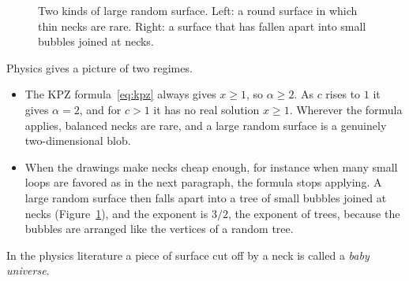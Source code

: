 \begin{figure}[b]
\centering
{}
\caption{Two kinds of large random surface. Left: a round surface in which thin necks are rare.
Right: a surface that has fallen apart into small bubbles joined at necks.}
\label{fig:bubbles}
\end{figure}

Physics gives a picture of two regimes.
\begin{itemize}
\item The KPZ formula~\eqref{eq:kpz} always gives $x\ge1$, so $\alpha\ge2$. As $c$ rises to $1$
it gives $\alpha=2$, and for $c>1$ it has no real solution $x\ge1$. Wherever the formula applies,
balanced necks are rare, and a large random surface is a genuinely two-dimensional blob.
\item When the drawings make necks cheap enough, for instance when many small loops are favored
as in the next paragraph, the formula stops applying. A large random
surface then falls apart into a tree of small bubbles joined at necks
(Figure~\ref{fig:bubbles}), and the exponent is $3/2$, the exponent of trees, because the
bubbles are arranged like the vertices of a random tree.
\end{itemize}
In the physics literature a piece of surface cut off by a neck is called a \emph{baby universe}.

